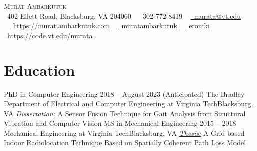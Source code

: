 \documentclass[letterpaper,11pt]{article}
\begin{document}
\nocite{ambarkutuk2022sensor}
\nocite{ambarkutuk2021uncertainty}
\nocite{sa2021investigation}
\nocite{sa2020towards}
\nocite{ambarkutuk2017grid}
\nocite{ocak2015image}
\nocite{guner2015meslek}
\nocite{guner2014distance}
\nocite{guner2013magnetic}

\begin{center}
    {\Huge \scshape Murat Ambarkutuk} \\ \vspace{1pt}
    \faHome~402 Ellett Road, Blacksburg, VA 204060
	~ \small \raisebox{-0.1\height}\faPhone\ 302-772-8419
	~ \href{mailto:murata@vt.edu}{\raisebox{-0.2\height}\faEnvelope\  \underline{murata@vt.edu}} \\
	~ \href{https://murat.ambarkutuk.com}{\raisebox{-0.2\height}\faBookmark\  \underline{https://murat.ambarkutuk.com}} 
    ~ \href{https://linkedin.com/in/muratambarkutuk/}{\raisebox{-0.2\height}\faLinkedin\ \underline{muratambarkutuk}}
	~ \href{https://github.com/eroniki}{\raisebox{-0.2\height}\faGithub\ \underline{eroniki}}
	~ \href{https://code.vt.edu/murata}{\raisebox{-0.2\height}\faGitlab\ \underline{https://code.vt.edu/murata}}
	\vspace{-8pt}
\end{center}

\section{Education}
  \resumeSubHeadingListStart
    \resumeSubheading
      {PhD in Computer Engineering}
	  {2018 -- August 2023 (Anticipated)}
      {The Bradley Department of Electrical and Computer Engineering at Virginia Tech}{Blacksburg, VA}
		\vspace{-2ex}
		\resumeItemListStart
	    \resumeItemListEnd
	  \textit{\underline{Dissertation:}} A Sensor Fusion Technique for Gait Analysis from Structural Vibration and Computer Vision 
	  \resumeSubheading
      {MS in Mechanical Engineering}
	  {2015 -- 2018}
      {Mechanical Engineering at Virginia Tech}{Blacksburg, VA}
	  \textit{\underline{Thesis:}} A Grid based Indoor Radiolocation Technique Based on Spatially Coherent Path Loss Model
	  
\end{document}
